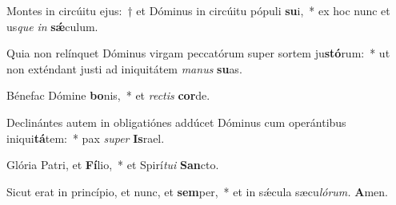 \item Montes in circúitu ejus:~† et Dóminus in circúitu pópuli \textbf{su}i,~* ex hoc nunc et us\tinyhspace\textit{que} \textit{in} \textbf{sǽ}culum.
\item Quia non relínquet Dóminus virgam peccatórum super sortem ju\textbf{stó}rum:~* ut non exténdant justi ad iniquitátem \textit{manus} \textbf{su}as.
\item Bénefac Dómine \textbf{bo}nis,~* et \textit{rectis} \textbf{cor}de.
\item Declinántes autem in obligatiónes addúcet Dóminus cum operántibus iniqui\textbf{tá}tem:~* pax \textit{super} \textbf{Is}rael.
\item Glória Patri, et \textbf{Fí}lio,~* et Spirí\tinyhspace\textit{tui} \textbf{San}cto.
\item Sicut erat in princípio, et nunc, et \textbf{sem}per,~* et in sǽcula sæcu\tinyhspace\textit{lórum.} \textbf{A}men.
